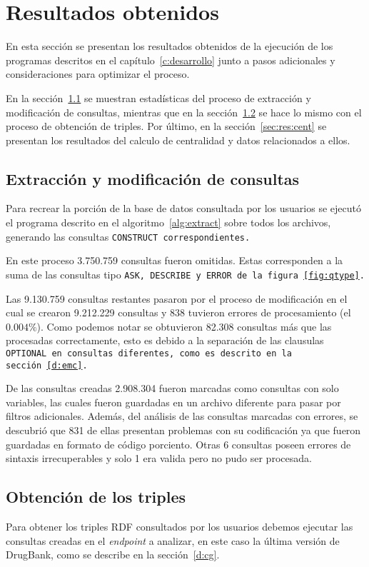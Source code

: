 \section{Resultados obtenidos}\label{sec:res}
En esta sección se presentan los resultados obtenidos de la ejecución de los
programas descritos en el capítulo~\ref{c:desarrollo} junto a pasos 
adicionales y consideraciones para optimizar el proceso.

En la sección~\ref{sec:res:extr} se muestran estadísticas del proceso de
extracción y modificación de consultas, mientras que en la
sección~\ref{sec:res:obt} se hace lo mismo con el proceso de obtención de
triples.
Por último, en la sección~\ref{sec:res:cent} se presentan los resultados del
calculo de centralidad y datos relacionados a ellos.

\subsection{Extracción y modificación de consultas}\label{sec:res:extr}
Para recrear la porción de la base de datos consultada por los usuarios se
ejecutó el programa descrito en el algoritmo~\ref{alg:extract} sobre todos los
archivos, generando las consultas \tt{CONSTRUCT} correspondientes.

En este proceso 3.750.759 consultas fueron omitidas. Estas corresponden a la
suma de las consultas tipo \tt{ASK}, \tt{DESCRIBE} y \tt{ERROR} de la
figura~\ref{fig:qtype}.

Las 9.130.759 consultas restantes pasaron por el proceso de modificación en el
cual se crearon 9.212.229 consultas y 838 tuvieron errores de procesamiento
(el $0.004\%$).
Como podemos notar se obtuvieron 82.308 consultas más que las procesadas
correctamente, esto es debido a la separación de las clausulas \tt{OPTIONAL} en
consultas diferentes, como es descrito en la sección~\ref{d:emc}.

De las consultas creadas 2.908.304 fueron marcadas como consultas con solo
variables, las cuales fueron guardadas en un archivo diferente para pasar por
filtros adicionales. 
Además, del análisis de las consultas marcadas con errores, se descubrió que
831 de ellas presentan problemas con su codificación ya que fueron guardadas en
formato de código porciento. Otras 6 consultas poseen errores de sintaxis
irrecuperables y solo 1 era valida pero no pudo ser procesada.

\subsection{Obtención de los triples}\label{sec:res:obt}
Para obtener los triples RDF consultados por los usuarios debemos ejecutar las
consultas creadas en el \emph{endpoint} a analizar, en este caso la última
versión de DrugBank, como se describe en la sección~\ref{d:cg}.

